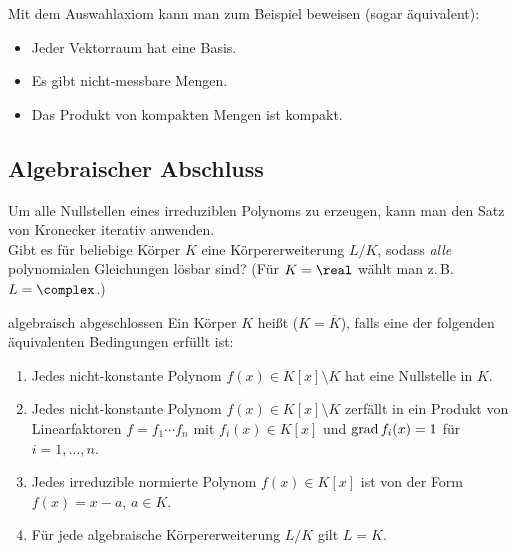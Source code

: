 \begin{Bsp}
    Mit dem Auswahlaxiom kann man zum Beispiel beweisen
    (sogar äquivalent):
    \begin{itemize}
        \item
        Jeder Vektorraum hat eine Basis.
        
        \item
        Es gibt nicht-messbare Mengen.
        
        \item
        Das Produkt von kompakten Mengen ist kompakt.
    \end{itemize}
\end{Bsp}

\pagebreak

\subsection{%
    Algebraischer Abschluss%
}

\begin{Bem}
    Um alle Nullstellen eines irreduziblen Polynoms zu erzeugen, kann
    man den Satz von Kronecker iterativ anwenden.\\
    Gibt es für beliebige Körper $K$ eine Körpererweiterung $L/K$, sodass
    \emph{alle} polynomialen Gleichungen lösbar sind?
    (Für $K = \real$ wählt man z.\,B. $L = \complex$.)
\end{Bem}

\begin{Def}{algebraisch abgeschlossen}
    Ein Körper $K$ heißt 
    ($K = \overline{K}$), falls eine der folgenden äquivalenten
    Bedingungen erfüllt ist:
    \begin{enumerate}[label=(\alph*)]
        \item
        Jedes nicht-konstante Polynom $f(x) \in K[x] \setminus K$ hat eine
        Nullstelle in $K$.
        
        \item
        Jedes nicht-konstante Polynom $f(x) \in K[x] \setminus K$ zerfällt in
        ein Produkt von Linearfaktoren $f = f_1 \dotsm f_n$ mit
        $f_i(x) \in K[x]$ und $\operatorname{grad} f_i(x) = 1$ für $i = 1, \dotsc, n$.
        
        \item
        Jedes irreduzible normierte Polynom $f(x) \in K[x]$ ist von der Form
        $f(x) = x - a$, $a \in K$.
        
        \item
        Für jede algebraische Körpererweiterung $L/K$ gilt $L = K$.
    \end{enumerate}
\end{Def}

